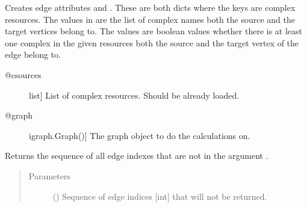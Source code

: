 \documentclass[letterpaper,10pt,english]{sphinxmanual}
\begin{document}
\begin{fulllineitems}
\begin{fulllineitems}
\end{fulllineitems}


\begin{fulllineitems}
\label{\detokenize{main:pypath.main.PyPath.edges_in_comlexes}}
Creates edge attributes  and .
These are both dicts where the keys are complex resources.
The values in  are the list of complex names
both the source and the target vertices belong to.
The values  are boolean values whether there
is at least one complex in the given resources both the
source and the target vertex of the edge belong to.
\begin{description}
\item[{@csources}] \leavevmode{[}list{]}
List of complex resources. Should be already loaded.

\item[{@graph}] \leavevmode{[}igraph.Graph(){]}
The graph object to do the calculations on.

\end{description}

\end{fulllineitems}


\begin{fulllineitems}
\label{\detokenize{main:pypath.main.PyPath.edges_ptms}}
\end{fulllineitems}


\begin{fulllineitems}
\label{\detokenize{main:pypath.main.PyPath.edgeseq_inverse}}
Returns the sequence of all edge indexes that are not in
the argument .
\begin{quote}\begin{description}
\item[{Parameters}] \leavevmode
{} () \textendash{} Sequence of edge indices {[}int{]} that will not be returned.


\end{description}
\end{quote}
\end{fulllineitems}
\end{fulllineitems}
\end{document}
